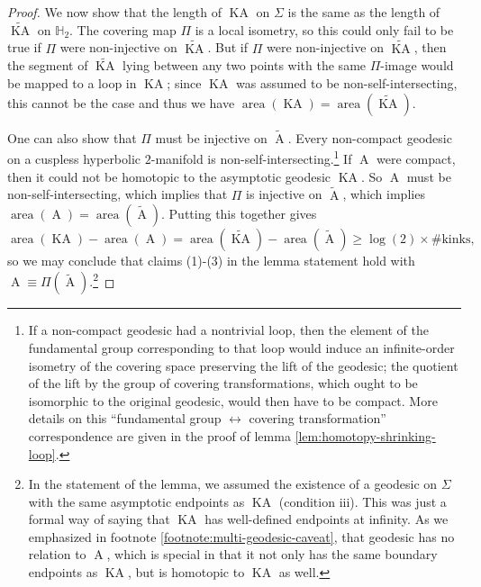 \documentclass[a4paper,11pt]{article}
\renewcommand{\tilde}{\widetilde}
\newcommand{\area}{\operatorname{area}}
\newcommand{\KA}{\operatorname{KA}}
\newcommand{\A}{\operatorname{A}}
\begin{document}
\begin{proof}
    We now show that the length of $\KA$ on $\Sigma$ is the same as the length of $\tilde{\KA}$ on $\mathbb{H}_{2}$. The covering map $\Pi$ is a local isometry, so this could only fail to be true if $\Pi$ were non-injective on $\tilde{\KA}$. But if $\Pi$ were non-injective on $\tilde{\KA}$, then the segment of $\tilde{\KA}$ lying between any two points with the same $\Pi$-image would be mapped to a loop in $\KA$; since $\KA$ was assumed to be non-self-intersecting, this cannot be the case and thus we have $\area(\KA) = \area(\tilde{\KA}).$
    
    One can also show that $\Pi$ must be injective on $\tilde{\A}$. Every non-compact geodesic on a cuspless hyperbolic $2$-manifold is non-self-intersecting.\footnote{If a non-compact geodesic had a nontrivial loop, then the element of the fundamental group corresponding to that loop would induce an infinite-order isometry of the covering space preserving the lift of the geodesic; the quotient of the lift by the group of covering transformations, which ought to be isomorphic to the original geodesic, would then have to be compact. More details on this ``fundamental group $\leftrightarrow$ covering transformation'' correspondence are given in the proof of lemma \ref{lem:homotopy-shrinking-loop}.} If $\A$ were compact, then it could not be homotopic to the asymptotic geodesic $\KA$. So $\A$ must be non-self-intersecting, which implies that $\Pi$ is injective on $\tilde{\A}$, which implies $\area(\A) = \area(\tilde{\A})$. Putting this together gives
    \begin{equation}
        \area(\KA) - \area(\A) = \area(\tilde{\KA}) - \area(\tilde{\A}) \geq \log(2) \times \text{\# kinks},
    \end{equation}
    so we may conclude that claims (1)-(3) in the lemma statement hold with $\A \equiv \Pi(\tilde{\A}).$\footnote{In the statement of the lemma, we assumed the existence of a geodesic on $\Sigma$ with the same asymptotic endpoints as $\KA$ (condition iii). This was just a formal way of saying that $\KA$ has well-defined endpoints at infinity. As we emphasized in footnote \ref{footnote:multi-geodesic-caveat}, that geodesic has no relation to $\A$, which is special in that it not only has the same boundary endpoints as $\KA$, but is homotopic to $\KA$ as well.}
\end{proof}
\end{document}
